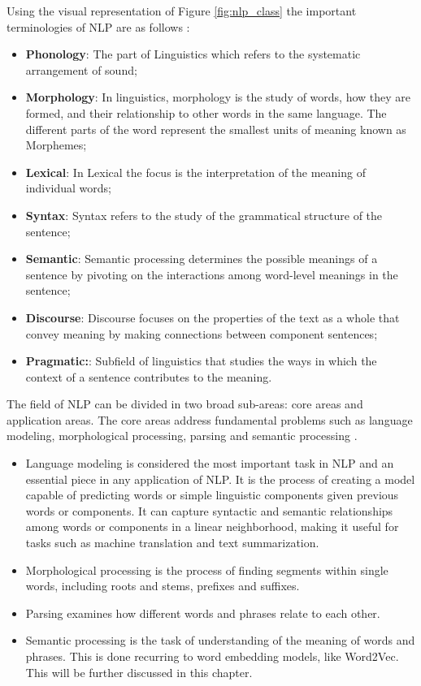Using the visual representation of Figure \ref{fig:nlp_class} the important terminologies of NLP are as follows \cite{Khurana2018} :

\begin{itemize}
    \item \textbf{Phonology}: The part of Linguistics which refers to the systematic arrangement of sound;
    \item \textbf{Morphology}: In linguistics, morphology is the study of words, how they are formed, and their relationship to other words in the same language. The different parts of the word represent the smallest units of meaning known as Morphemes;
    \item \textbf{Lexical}: In Lexical the focus is the interpretation of the meaning of individual words;
    \item \textbf{Syntax}: Syntax refers to the study of the grammatical structure of the sentence;
    \item  \textbf{Semantic}: Semantic processing determines the possible meanings of a
    sentence by pivoting on the interactions among word-level meanings in the sentence;
    \item \textbf{Discourse}: Discourse focuses on the properties of the text as a whole that convey meaning by making connections between component sentences;
    \item \textbf{Pragmatic:}: Subfield of linguistics that studies the ways in which the context of a sentence contributes to the meaning. 
    
\end{itemize}

The field of NLP can be divided in two broad sub-areas: core areas and application areas. The core areas address fundamental problems such as language modeling, morphological processing, parsing and semantic processing \cite{Otter2018}. 



\begin{itemize}
    \item Language modeling is considered the most important task in NLP and an essential piece in any application of NLP. It is the process of creating a model capable of predicting words or simple linguistic components given previous words or components. It can capture syntactic and semantic relationships among words or components in a linear neighborhood, making it useful for tasks such as machine translation and text summarization.
    \item Morphological processing is the process of finding segments within single words,  including roots and stems, prefixes and suffixes.
    \item Parsing examines how different words and phrases relate to each other.
    \item Semantic processing is the task of understanding of the meaning of words and phrases. This is done recurring to  word embedding models, like Word2Vec. This will be further discussed in this chapter.
\end{itemize}





